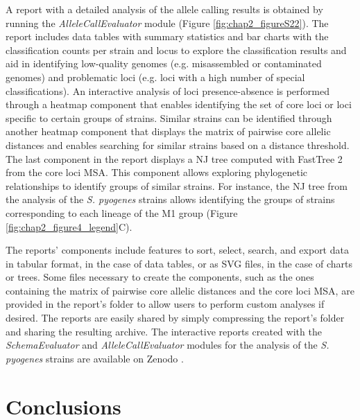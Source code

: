 A report with a detailed analysis of the allele calling results is obtained by running the \textit{AlleleCallEvaluator} module (Figure \ref{fig:chap2_figureS22}). The report includes data tables with summary statistics and bar charts with the classification counts per strain and locus to explore the classification results and aid in identifying low-quality genomes (e.g. misassembled or contaminated genomes) and problematic loci (e.g. loci with a high number of special classifications). An interactive analysis of loci presence-absence is performed through a heatmap component that enables identifying the set of core loci or loci specific to certain groups of strains. Similar strains can be identified through another heatmap component that displays the matrix of pairwise core allelic distances and enables searching for similar strains based on a distance threshold. The last component in the report displays a \ac{NJ} tree computed with FastTree 2 \citep{price_fasttree_2010} from the core loci \ac{MSA}. This component allows exploring phylogenetic relationships to identify groups of similar strains. For instance, the \ac{NJ} tree from the analysis of the \textit{S. pyogenes} strains allows identifying the groups of strains corresponding to each lineage of the M1 group (Figure \ref{fig:chap2_figure4_legend}C).

The reports' components include features to sort, select, search, and export data in tabular format, in the case of data tables, or as \ac{SVG} files, in the case of charts or trees. Some files necessary to create the components, such as the ones containing the matrix of pairwise core allelic distances and the core loci \ac{MSA}, are provided in the report's folder to allow users to perform custom analyses if desired. The reports are easily shared by simply compressing the report's folder and sharing the resulting archive. The interactive reports created with the \textit{SchemaEvaluator} and \textit{AlleleCallEvaluator} modules for the analysis of the \textit{S. pyogenes} strains are available on Zenodo \citep{mamede_supplementary_2025}.

\section{Conclusions} \label{sec:conclusions}

